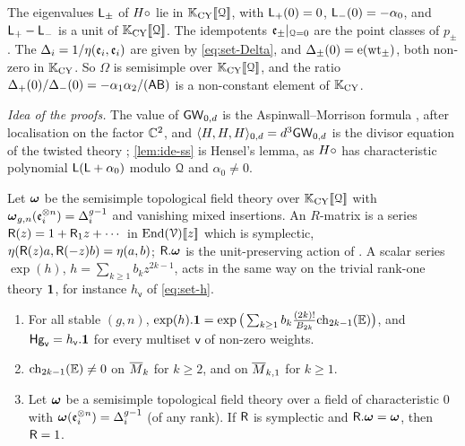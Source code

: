 \begin{lem}[{\Lref{Lemma~5.4}: semisimplicity at $\cQ=0$}]
\label{lem:ide-ss}
The eigenvalues $\mathsf{L}_\pm$ of $H\circ$ lie in $\mathbb{K}_{\mathrm{CY}}[\![ \mathcal{Q} ]\!]$, with $\mathsf{L}_+(0)=0$, $\mathsf{L}_-(0)=-\alpha_0$, and $\mathsf{L}_+-\mathsf{L}_-$ is a unit of $\mathbb{K}_{\mathrm{CY}}[\![ \mathcal{Q} ]\!]$. The idempotents $\mathfrak{e}_\pm|_{\mathcal{Q}=0}$ are the point classes of $p_\pm$. The $\Delta_i=1/\eta(\mathfrak{e}_i,\mathfrak{e}_i)$ are given by \eqref{eq:set-Delta}, and $\Delta_\pm(0)=\mathrm{e}(\mathrm{wt}_\pm)$, both non-zero in $\mathbb{K}_{\mathrm{CY}}$. So $\Omega$ is semisimple over $\mathbb{K}_{\mathrm{CY}}[\![ \mathcal{Q} ]\!]$, and the ratio $\Delta_+(0)/\Delta_-(0)=-\alpha_1\alpha_2/(\mathsf{A}\mathsf{B})$ is a non-constant element of $\mathbb{K}_{\mathrm{CY}}$.
\end{lem}

\emph{Idea of the proofs.} The value of $\mathsf{GW}_{0,d}$ is the Aspinwall--Morrison formula \cite[p.~3]{FP00}, after localisation on the factor $\mathbb{C}^2$, and $\langle H,H,H\rangle_{0,d}=d^3\mathsf{GW}_{0,d}$ is the divisor equation of the twisted theory \cite[App.~1~(iv)]{CG07}; \cref{lem:ide-ss} is Hensel's lemma, as $H\circ$ has characteristic polynomial $\mathsf{L}(\mathsf{L}+\alpha_0)$ modulo $\mathcal{Q}$ and $\alpha_0\neq0$.

Let $\boldsymbol{\omega}$ be the semisimple topological field theory over $\mathbb{K}_{\mathrm{CY}}[\![ \mathcal{Q} ]\!]$ with $\boldsymbol{\omega}_{g,n}(\mathfrak{e}_i^{\otimes n})=\Delta_i^{g-1}$ and vanishing mixed insertions. An $R$-matrix is a series $\mathsf{R}(z)=1+\mathsf{R}_1z+\cdots$ in $\operatorname{End}(\mathcal{V})[\![ z ]\!]$ which is symplectic, $\eta(\mathsf{R}(z)a,\mathsf{R}(-z)b)=\eta(a,b)$; $\mathsf{R}.\boldsymbol{\omega}$ is the unit-preserving action of \cite[Definitions~2.2, 2.13]{PPZ15}. A scalar series $\exp(h)$, $h=\sum_{k\geq1}b_kz^{2k-1}$, acts in the same way on the trivial rank-one theory $\mathbf{1}$, for instance $h_{\mathsf{v}}$ of \eqref{eq:set-h}.

\begin{lem}
\label{lem:ide-mumford}
\begin{enumerate}
\item For all stable $(g,n)$, $\exp(h).\mathbf{1}=\exp\big(\sum_{k\geq1}b_k\frac{(2k)!}{B_{2k}}\mathrm{ch}_{2k-1}(\mathbb{E})\big)$, and $\mathsf{Hg}_{\mathsf{v}}=h_{\mathsf{v}}.\mathbf{1}$ for every multiset $\mathsf{v}$ of non-zero weights.
\item $\mathrm{ch}_{2k-1}(\mathbb{E})\neq0$ on $\overline{M}_k$ for $k\geq2$, and on $\overline{M}_{k,1}$ for $k\geq1$.
\item Let $\boldsymbol{\omega}$ be a semisimple topological field theory over a field of characteristic $0$ with $\boldsymbol{\omega}(\mathfrak{e}_i^{\otimes n})=\Delta_i^{g-1}$ (of any rank). If $\mathsf{R}$ is symplectic and $\mathsf{R}.\boldsymbol{\omega}=\boldsymbol{\omega}$, then $\mathsf{R}=1$.
\end{enumerate}
\end{lem}

